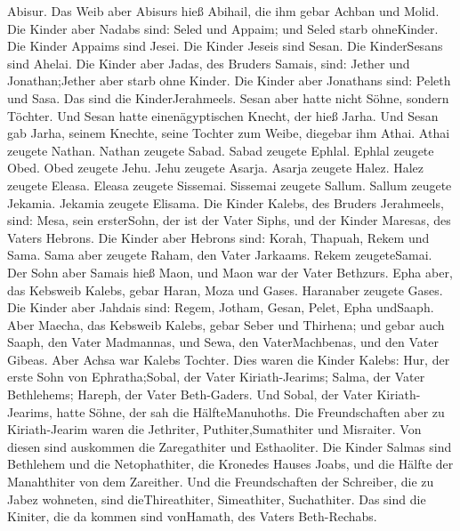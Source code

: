 Abisur.  Das Weib aber Abisurs hieß Abihail, die ihm gebar
Achban und Molid.  Die Kinder aber Nadabs sind: Seled und
Appaim; und Seled starb ohneKinder.  Die Kinder Appaims
sind Jesei. Die Kinder Jeseis sind Sesan. Die KinderSesans sind Ahelai.
 Die Kinder aber Jadas, des Bruders Samais, sind: Jether
und Jonathan;Jether aber starb ohne Kinder.  Die Kinder
aber Jonathans sind: Peleth und Sasa. Das sind die KinderJerahmeels.
 Sesan aber hatte nicht Söhne, sondern Töchter. Und Sesan
hatte einenägyptischen Knecht, der hieß Jarha.  Und Sesan
gab Jarha, seinem Knechte, seine Tochter zum Weibe, diegebar ihm Athai.
 Athai zeugete Nathan. Nathan zeugete Sabad. 
Sabad zeugete Ephlal. Ephlal zeugete Obed.  Obed zeugete
Jehu. Jehu zeugete Asarja.  Asarja zeugete Halez. Halez
zeugete Eleasa.  Eleasa zeugete Sissemai. Sissemai zeugete
Sallum.  Sallum zeugete Jekamia. Jekamia zeugete Elisama.
 Die Kinder Kalebs, des Bruders Jerahmeels, sind: Mesa,
sein ersterSohn, der ist der Vater Siphs, und der Kinder Maresas, des
Vaters Hebrons.  Die Kinder aber Hebrons sind: Korah,
Thapuah, Rekem und Sama.  Sama aber zeugete Raham, den
Vater Jarkaams. Rekem zeugeteSamai.  Der Sohn aber Samais
hieß Maon, und Maon war der Vater Bethzurs.  Epha aber, das
Kebsweib Kalebs, gebar Haran, Moza und Gases. Haranaber zeugete Gases.
 Die Kinder aber Jahdais sind: Regem, Jotham, Gesan, Pelet,
Epha undSaaph.  Aber Maecha, das Kebsweib Kalebs, gebar
Seber und Thirhena;  und gebar auch Saaph, den Vater
Madmannas, und Sewa, den VaterMachbenas, und den Vater Gibeas. Aber
Achsa war Kalebs Tochter.  Dies waren die Kinder Kalebs:
Hur, der erste Sohn von Ephratha;Sobal, der Vater Kiriath-Jearims;
 Salma, der Vater Bethlehems; Hareph, der Vater
Beth-Gaders.  Und Sobal, der Vater Kiriath-Jearims, hatte
Söhne, der sah die HälfteManuhoths.  Die Freundschaften
aber zu Kiriath-Jearim waren die Jethriter, Puthiter,Sumathiter und
Misraiter. Von diesen sind auskommen die Zaregathiter und Esthaoliter.
 Die Kinder Salmas sind Bethlehem und die Netophathiter,
die Kronedes Hauses Joabs, und die Hälfte der Manahthiter von dem
Zareither.  Und die Freundschaften der Schreiber, die zu
Jabez wohneten, sind dieThireathiter, Simeathiter, Suchathiter. Das sind
die Kiniter, die da kommen sind vonHamath, des Vaters Beth-Rechabs.

